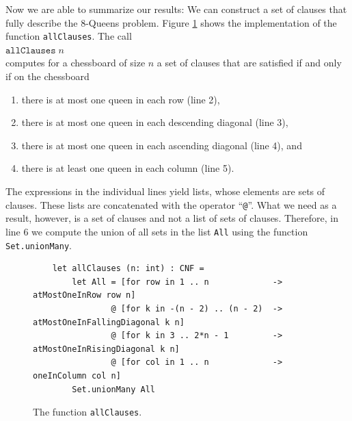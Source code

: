 Now we are able to summarize our results: We can construct a set of clauses that fully describe the 8-Queens problem.
Figure \ref{fig:allClauses} shows the implementation of the function \texttt{allClauses}.
The call \\[0.2cm]
\hspace*{1.3cm} $\texttt{allClauses}\;n$ \\[0.2cm]
computes for a chessboard of size $n$ a set of clauses that
are satisfied if and only if on the chessboard
\begin{enumerate}
\item there is at most one queen in each row (line 2),
\item there is at most one queen in each descending diagonal (line 3),
\item there is at most one queen in each ascending diagonal (line 4), and
\item there is at least one queen in each column (line 5).
\end{enumerate}
The expressions in the individual lines yield lists, whose elements
are sets of clauses.  These lists are concatenated with the operator ``\texttt{@}''.
What we need as a result, however, is a set of clauses
and not a list of sets of clauses. Therefore, in line 6 we compute the union of all sets in the list
\texttt{All} using the function \texttt{Set.unionMany}.

\begin{figure}[!ht]
  \centering
\begin{verbatim}
    let allClauses (n: int) : CNF =
        let All = [for row in 1 .. n             -> atMostOneInRow row n]
                @ [for k in -(n - 2) .. (n - 2)  -> atMostOneInFallingDiagonal k n]
                @ [for k in 3 .. 2*n - 1         -> atMostOneInRisingDiagonal k n]
                @ [for col in 1 .. n             -> oneInColumn col n]
        Set.unionMany All
\end{verbatim}
\vspace*{-0.3cm}
  \caption{The function \texttt{allClauses}.}
  \label{fig:allClauses}
\end{figure}

